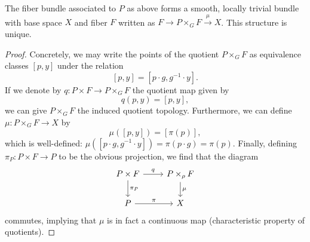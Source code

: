 \begin{lem}
    The fiber bundle associated to $P$ as above forms a smooth, locally trivial bundle with base space $X$ and fiber $F$
    written as $F\to P\times_GF\xrightarrow{\mu}X$. This structure is unique.
\end{lem}
\begin{proof}
    Concretely, we may write the points of the quotient $P\times_G F$ as equivalence classes $[p,y]$ under the relation
    \[[p,y]=[p\cdot g,g^{-1}\cdot y].\]
    If we denote by $q:P\times F\to P\times_G F$ the quotient map given by
    \[q(p,y)=[p,y],\]
    we can give $P\times_G F$ the induced quotient topology. Furthermore, we can define $\mu:P\times_G F\to X$ by
    \[\mu([p,y])=[\pi(p)],\]
    which is well-defined: $\mu([p\cdot g,g^{-1}\cdot y])=\pi(p\cdot g)=\pi(p)$. Finally, defining
    $\pi_P:P\times F\to P$ to be the obvious projection, we find that the diagram
    \begin{equation*}
        \begin{tikzcd}
            P\times F\arrow{r}{q}\arrow{d}{\pi_P}&P\times_\rho F\arrow{d}{\mu}\\
            P\arrow{r}{\pi}&X
        \end{tikzcd}
    \end{equation*}
    commutes, implying that $\mu$ is in fact a continuous map (characteristic property of quotients).
    

\end{proof}
